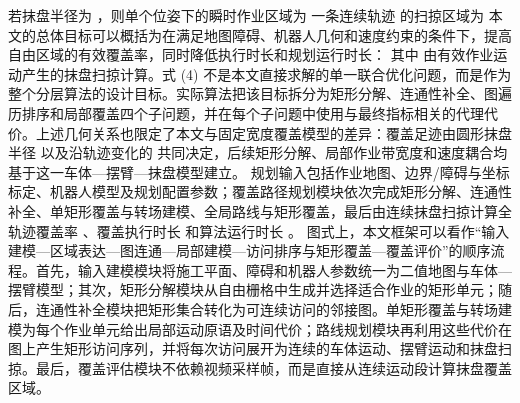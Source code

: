 {}若抹盘半径为 ，则单个位姿下的瞬时作业区域为\markdownRendererParagraphSeparator
{}\markdownRendererParagraphSeparator
{}一条连续轨迹  的扫掠区域为\markdownRendererParagraphSeparator
{}\markdownRendererParagraphSeparator
{}本文的总体目标可以概括为在满足地图障碍、机器人几何和速度约束的条件下，提高自由区域的有效覆盖率，同时降低执行时长和规划运行时长：\markdownRendererParagraphSeparator
{}\markdownRendererParagraphSeparator
{}其中  由有效作业运动产生的抹盘扫掠计算。式 (4) 不是本文直接求解的单一联合优化问题，而是作为整个分层算法的设计目标。实际算法把该目标拆分为矩形分解、连通性补全、图遍历排序和局部覆盖四个子问题，并在每个子问题中使用与最终指标相关的代理代价。上述几何关系也限定了本文与固定宽度覆盖模型的差异：覆盖足迹由圆形抹盘半径  以及沿轨迹变化的  共同决定，后续矩形分解、局部作业带宽度和速度耦合均基于这一车体—摆臂—抹盘模型建立。\markdownRendererInterblockSeparator
{}
\markdownRendererSectionEnd 
\markdownRendererSectionEnd \markdownRendererSectionBegin
{}\markdownRendererInterblockSeparator
{}\markdownRendererParagraphSeparator
{} 规划输入包括作业地图、边界/障碍与坐标标定、机器人模型及规划配置参数；覆盖路径规划模块依次完成矩形分解、连通性补全、单矩形覆盖与转场建模、全局路线与矩形覆盖，最后由连续抹盘扫掠计算全轨迹覆盖率 、覆盖执行时长  和算法运行时长 。\markdownRendererParagraphSeparator
{}图式上，本文框架可以看作“输入建模—区域表达—图连通—局部建模—访问排序与矩形覆盖—覆盖评价”的顺序流程。首先，输入建模模块将施工平面、障碍和机器人参数统一为二值地图与车体—摆臂模型；其次，矩形分解模块从自由栅格中生成并选择适合作业的矩形单元；随后，连通性补全模块把矩形集合转化为可连续访问的邻接图。单矩形覆盖与转场建模为每个作业单元给出局部运动原语及时间代价；路线规划模块再利用这些代价在图上产生矩形访问序列，并将每次访问展开为连续的车体运动、摆臂运动和抹盘扫掠。最后，覆盖评估模块不依赖视频采样帧，而是直接从连续运动段计算抹盘覆盖区域。\markdownRendererParagraphSeparator
